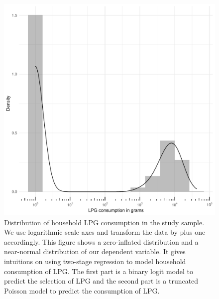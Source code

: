\documentclass[11pt]{article}
\begin{document}
\begin{figure}[h!]
\centering
\includegraphics[scale=1]{Figures/Descriptive_Statistics/distribution_lpg_log.pdf}
\caption{Distribution of household LPG consumption in the study sample. We use logarithmic scale axes and transform the data by plus one accordingly. This figure shows a zero-inflated distribution and a near-normal distribution of our dependent variable. It gives intuitions on using two-stage regression to model household consumption of LPG. The first part is a binary logit model to predict the selection of LPG and the second part is a truncated Poisson model to predict the consumption of LPG.}
\label{distribution_lpg_log}
\end{figure}
\end{document}
